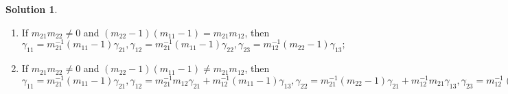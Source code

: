\documentclass[a4paper,10pt]{amsart}
\theoremstyle{definition}
\newtheorem{solution}[theorem]{Solution}
\numberwithin{equation}{section}
\begin{document}
\begin{solution}
\begin{enumerate}
\item If $m_{21}m_{22}\neq 0$ and $(m_{22}-1)(m_{11}-1)=m_{21}m_{12}$, then
    $
    \gamma_{11}=m_{21}^{-1}(m_{11}-1)\gamma_{21},
    \gamma_{12}=m_{21}^{-1}(m_{11}-1)\gamma_{22},
    \gamma_{23}=m_{12}^{-1}(m_{22}-1)\gamma_{13};
    $
\item If $m_{21}m_{22}\neq 0$ and $(m_{22}-1)(m_{11}-1)\neq m_{21}m_{12}$,
then $
\gamma_{11}=m_{21}^{-1}(m_{11}-1)\gamma_{21},
    \gamma_{12}=m_{21}^{-1}m_{12}\gamma_{21}+m_{12}^{-1}(m_{11}-1)\gamma_{13},
    \gamma_{22}=m_{21}^{-1}(m_{22}-1)\gamma_{21}+m_{12}^{-1}m_{21}\gamma_{13},
    \gamma_{23}=m_{12}^{-1}(m_{22}-1)\gamma_{13}.
$
%
%



\end{enumerate}
\end{solution}
\end{document}
